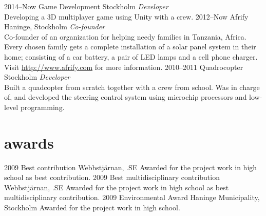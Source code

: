 \documentclass[]{friggeri-cv} %
\begin{document}
\begin{entrylist}
\entry
{2014--Now}
{Game Development}
{Stockholm}
{\emph{Developer} \\
Developing a 3D multiplayer game using Unity with a crew.}
\entry
{2012--Now}
{Afrify}
{Haninge, Stockholm}
{\emph{Co-founder} \\
Co-founder of an organization for helping needy families in Tanzania, Africa. Every chosen family gets a complete installation of a solar panel system in their home; consisting of a car battery, a pair of LED lamps and a cell phone charger. Visit \href{http://www.afrify.com}{http://www.afrify.com} for more information.}
\entry
{2010--2011}
{Quadrocopter}
{Stockholm}
{\emph{Developer} \\
Built a quadcopter from scratch together with a crew from school. Was in charge of, and developed the steering control system using microchip processors and low-level programming.}
\end{entrylist}


\section{awards}

\begin{entrylist}
\entry
{2009}
{Best contribution}
{Webbstjärnan, .SE}
{Awarded for the project work in high school as best contribution.}
\entry
{2009}
{Best multidisciplinary contribution}
{Webbstjärnan, .SE}
{Awarded for the project work in high school as best multidisciplinary contribution.}
\entry
{2009}
{Environmental Award}
{Haninge Municipality, Stockholm}
{Awarded for the project work in high school.}
\end{entrylist}

\end{document}
